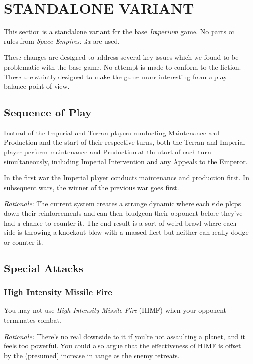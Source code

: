 \section{STANDALONE VARIANT}
\hfill

This section is a standalone variant for the base \textit{Imperium} game. No parts or rules from \textit{Space Empires: 4x} are used.

These changes are designed to address several key issues which we found to be problematic with the base game. No attempt is made to conform to the fiction. These are strictly designed to make the game more interesting from a play balance point of view.

\subsection{Sequence of Play}

Instead of the Imperial and Terran players conducting Maintenance and Production and the start of their respective turns, both the Terran and Imperial player perform maintenance and Production at the start of each turn simultaneously, including Imperial Intervention and any Appeals to the Emperor.

In the first war the Imperial player conducts maintenance and production first. In subsequent wars, the winner of the previous war goes first.

\textit{Rationale}: The current system creates a strange dynamic where each side plops down their reinforcements and can then bludgeon their opponent before they've had a chance to counter it. The end result is a sort of weird brawl where each side is throwing a knockout blow with a massed fleet but neither can really dodge or counter it.

\subsection{Special Attacks}

\subsubsection{High Intensity Missile Fire}

You may not use \textit{High Intensity Missile Fire} (HIMF) when your opponent terminates combat.

\textit{Rationale:} There's no real downside to it if you're not assaulting a planet, and it feels too powerful. You could also argue that the effectiveness of HIMF is offset by the (presumed) increase in range as the enemy retreats.


